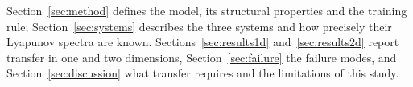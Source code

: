 Section~\ref{sec:method} defines the model, its structural properties and
the training rule; Section~\ref{sec:systems} describes the three systems
and how precisely their Lyapunov spectra are known.
Sections~\ref{sec:results1d} and~\ref{sec:results2d} report transfer in
one and two dimensions, Section~\ref{sec:failure} the failure modes, and
Section~\ref{sec:discussion} what transfer requires and the limitations
of this study.
